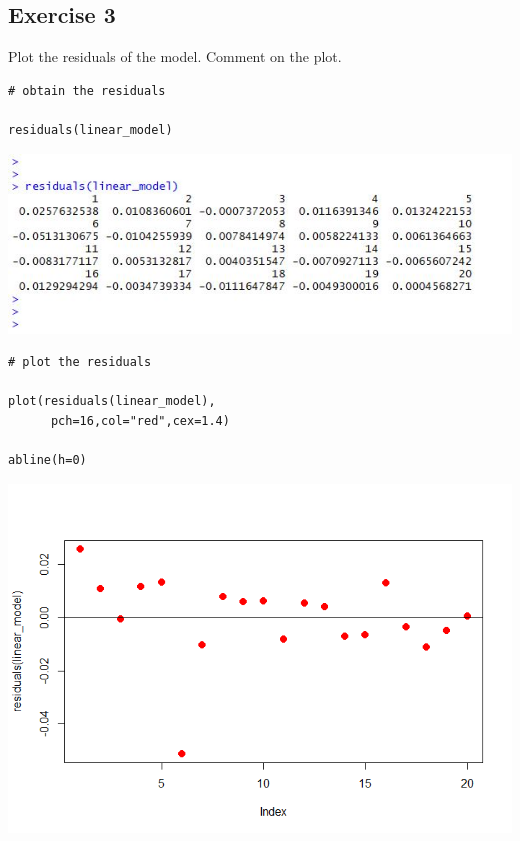 \documentclass[a4paper,12pt]{article}
\begin{document}
\newpage 
\subsection*{Exercise 3}

\noindent Plot the residuals of the model. Comment on the plot.






\begin{framed}\begin{verbatim}
# obtain the residuals

residuals(linear_model)

\end{verbatim} \end{framed}


\includegraphics[scale=1.1]{00-A1/images/CablesData_3_residuals.JPG}


\newpage 

\begin{framed}\begin{verbatim}
# plot the residuals

plot(residuals(linear_model),
      pch=16,col="red",cex=1.4)

abline(h=0)

\end{verbatim} \end{framed}


\includegraphics[scale=0.8]{00-A1/images/CableData_4_Residuals.png}
\end{document}
